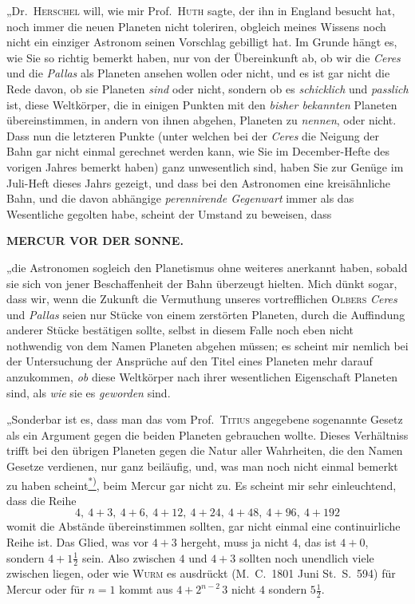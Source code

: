 „Dr.\ \textsc{Herschel} will, wie mir Prof.\ \textsc{Huth} sagte, der ihn in England besucht hat, noch immer die neuen Planeten nicht toleriren, obgleich meines Wissens noch nicht ein einziger Astronom seinen Vorschlag gebilligt hat. Im Grunde hängt es, wie Sie so richtig bemerkt haben, nur von der Übereinkunft ab, ob wir die \textit{Ceres} und die \textit{Pallas} als Planeten ansehen wollen oder nicht, und es ist gar nicht die Rede davon, ob sie Planeten \textit{sind} oder nicht, sondern ob es \textit{schicklich} und \textit{passlich} ist, diese Weltkörper, die in einigen Punkten mit den \textit{bisher bekannten} Planeten übereinstimmen, in andern von ihnen abgehen, Planeten zu \textit{nennen}, oder nicht. Dass nun die letzteren Punkte (unter welchen bei der \textit{Ceres} die Neigung der Bahn gar nicht einmal gerechnet werden kann, wie Sie im December-Hefte des vorigen Jahres bemerkt haben) ganz unwesentlich sind, haben Sie zur Genüge im Juli-Heft dieses Jahrs gezeigt, und dass bei den Astronomen eine kreisähnliche Bahn, und die davon abhängige \textit{perennirende Gegenwart} immer als das Wesentliche gegolten habe, scheint der Umstand zu beweisen, dass
\par\clearpage
\thispagestyle{empty}
\noindent{}%
\makebox[12mm][l]{}%
\parbox[t]{\dimexpr\linewidth-24mm\relax}{\centering\footnotesize\bfseries MERCUR VOR DER SONNE.\par}%
\par\nobreak\medskip
\noindent „die Astronomen sogleich den Planetismus ohne weiteres anerkannt haben, sobald sie sich von jener Beschaffenheit der Bahn überzeugt hielten. Mich dünkt sogar, dass wir, wenn die Zukunft die Vermuthung unseres vortrefflichen \textsc{Olbers} \textit{Ceres} und \textit{Pallas} seien nur Stücke von einem zerstörten Planeten, durch die Auffindung anderer Stücke bestätigen sollte, selbst in diesem Falle noch eben nicht nothwendig von dem Namen Planeten abgehen müssen; es scheint mir nemlich bei der Untersuchung der Ansprüche auf den Titel eines Planeten mehr darauf anzukommen, \textit{ob} diese Weltkörper nach ihrer wesentlichen Eigenschaft Planeten sind, als \textit{wie} sie es \textit{geworden} sind.

„Sonderbar ist es, dass man das vom Prof.\ \textsc{Titius} angegebene sogenannte Gesetz als ein Argument gegen die beiden Planeten gebrauchen wollte. Dieses Verhältniss trifft bei den übrigen Planeten gegen die Natur aller Wahrheiten, die den Namen Gesetze verdienen, nur ganz beiläufig, und, was man noch nicht einmal bemerkt zu haben scheint\hyperlink{native-236-note}{\textsuperscript{*)}}, beim Mercur gar nicht zu. Es scheint mir sehr einleuchtend, dass die Reihe
\[
4,\ 4+3,\ 4+6,\ 4+12,\ 4+24,\ 4+48,\ 4+96,\ 4+192
\]
womit die Abstände übereinstimmen sollten, gar nicht einmal eine continuirliche Reihe ist. Das Glied, was vor $4+3$ hergeht, muss ja nicht $4$, das ist $4+0$, sondern $4+1\frac12$ sein. Also zwischen $4$ und $4+3$ sollten noch unendlich viele zwischen liegen, oder wie \textsc{Wurm} es ausdrückt (M.\ C.\ 1801 Juni St.\ S.\ 594) für Mercur oder für $n=1$ kommt aus $4+2^{n-2}\,3$ nicht $4$ sondern $5\frac12$.


